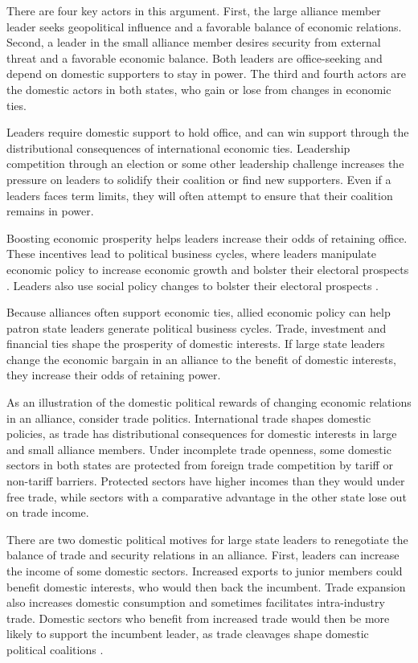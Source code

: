 \documentclass[12pt]{article}
\begin{document}
There are four key actors in this argument. 
First, the large alliance member leader seeks geopolitical influence and a favorable balance of economic relations. 
Second, a leader in the small alliance member desires security from external threat and a favorable economic balance.
Both leaders are office-seeking and depend on domestic supporters to stay in power.
The third and fourth actors are the domestic actors in both states, who gain or lose from changes in economic ties. 


Leaders require domestic support to hold office, and can win support through the distributional consequences of international economic ties. 
Leadership competition through an election or some other leadership challenge increases the pressure on leaders to solidify their coalition or find new supporters. 
Even if a leaders faces term limits, they will often attempt to ensure that their coalition remains in power.  


Boosting economic prosperity helps leaders increase their odds of retaining office. 
These incentives lead to political business cycles, where leaders manipulate economic policy to increase economic growth and bolster their electoral prospects \citep{Rogoff1987, ClarkHallerberg2000}.
Leaders also use social policy changes to bolster their electoral prospects \citep{Ahlquist2010, Philips2020}. 


Because alliances often support economic ties, allied economic policy can help patron state leaders generate political business cycles. 
Trade, investment and financial ties shape the prosperity of domestic interests.
If large state leaders change the economic bargain in an alliance to the benefit of domestic interests, they increase their odds of retaining power. 


As an illustration of the domestic political rewards of changing economic relations in an alliance, consider trade politics.
International trade shapes domestic policies, as trade has distributional consequences for domestic interests in large and small alliance members.
Under incomplete trade openness, some domestic sectors in both states are protected from foreign trade competition by tariff or non-tariff barriers. 
Protected sectors have higher incomes than they would under free trade, while sectors with a comparative advantage in the other state lose out on trade income. 


There are two domestic political motives for large state leaders to renegotiate the balance of trade and security relations in an alliance. 
First, leaders can increase the income of some domestic sectors.
Increased exports to junior members could benefit domestic interests, who would then back the incumbent. 
Trade expansion also increases domestic consumption and sometimes facilitates intra-industry trade.
Domestic sectors who benefit from increased trade would then be more likely to support the incumbent leader, as trade cleavages shape domestic political coalitions \citep{Rogowski1987, Hiscox2001}. 
 
\end{document}
